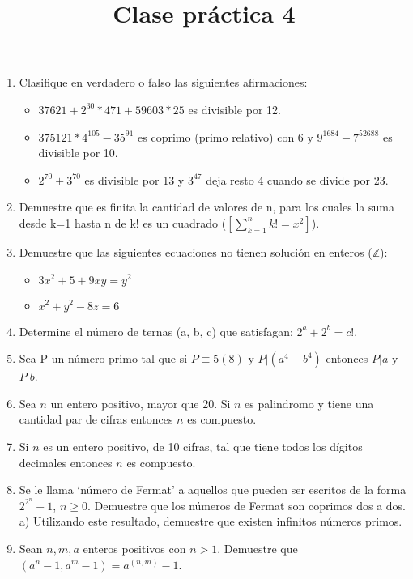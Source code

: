 \documentclass{article}
\title{Clase pr\'actica 4}
\begin{document}
\maketitle
\begin{enumerate}
    \item Clasifique en verdadero o falso las siguientes afirmaciones:
    \begin{itemize} 
        \item $37621 + 2^{30} * 471 + 59603 * 25$ es divisible por 12.
        \item $375121  * 4^{105} - 35^{91}$ es coprimo (primo relativo) con 6 y $9^{1684} - 7^{52688}$ es divisible por 10.
        \item $2^{70} + 3^{70}$ es divisible por 13 y $3^{47}$ deja resto 4 cuando se divide por 23.
    \end{itemize}
    \item Demuestre que es finita la cantidad de valores de n, para los cuales la suma desde k=1 hasta n de k! es un cuadrado ($\left[\sum_{k=1}^{n} k! = x^{2}\right]$).
    \item Demuestre que las siguientes ecuaciones no tienen soluci\'on en enteros ($\mathbb{Z}$):
        \begin{itemize}
            \item $3x^{2} + 5 + 9xy = y^{2}$
            \item $x^{2} + y^{2} - 8z = 6$
        \end{itemize}
    \item Determine el n\'umero de ternas (a, b, c) que satisfagan: $2^{a} + 2^{b} = c!$.
    \item Sea P un n\'umero primo tal que si $P \equiv 5(8)$ y $P| \left( a^{4} + b^{4} \right) $ entonces $P|a$ y $P|b$.
    
    \item Sea $n$ un entero positivo, mayor que 20. Si $n$ es palindromo y tiene una cantidad par de cifras entonces $n$ es compuesto.
    
    \item Si $n$ es un entero positivo, de 10 cifras, tal que tiene todos los dígitos decimales entonces $n$ es compuesto.

    \item Se le llama `n\'umero de Fermat' a aquellos que pueden ser escritos de la forma $2^{2^{n}}+ 1$, $n \geq 0$. Demuestre que los n\'umeros de Fermat son coprimos dos a dos.\\
    a) Utilizando este resultado, demuestre que existen infinitos n\'umeros primos.    

    \item Sean $n, m, a$ enteros positivos con $n>1$. Demuestre que $(a ^ n - 1, a ^ m - 1) = a ^ {(n, m)} - 1$.
\end{enumerate}
\end{document}
